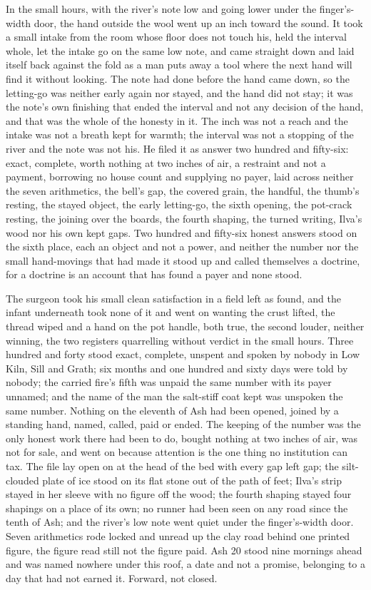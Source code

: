 In the small hours, with the river's note low and going lower under the finger's-width door, the hand outside the wool went up an inch toward the sound. It took a small intake from the room whose floor does not touch his, held the interval whole, let the intake go on the same low note, and came straight down and laid itself back against the fold as a man puts away a tool where the next hand will find it without looking. The note had done before the hand came down, so the letting-go was neither early again nor stayed, and the hand did not stay; it was the note's own finishing that ended the interval and not any decision of the hand, and that was the whole of the honesty in it. The inch was not a reach and the intake was not a breath kept for warmth; the interval was not a stopping of the river and the note was not his. He filed it as answer two hundred and fifty-six: exact, complete, worth nothing at two inches of air, a restraint and not a payment, borrowing no house count and supplying no payer, laid across neither the seven arithmetics, the bell's gap, the covered grain, the handful, the thumb's resting, the stayed object, the early letting-go, the sixth opening, the pot-crack resting, the joining over the boards, the fourth shaping, the turned writing, Ilva's wood nor his own kept gaps. Two hundred and fifty-six honest answers stood on the sixth place, each an object and not a power, and neither the number nor the small hand-movings that had made it stood up and called themselves a doctrine, for a doctrine is an account that has found a payer and none stood.

The surgeon took his small clean satisfaction in a field left as found, and the infant underneath took none of it and went on wanting the crust lifted, the thread wiped and a hand on the pot handle, both true, the second louder, neither winning, the two registers quarrelling without verdict in the small hours. Three hundred and forty stood exact, complete, unspent and spoken by nobody in Low Kiln, Sill and Grath; six months and one hundred and sixty days were told by nobody; the carried fire's fifth was unpaid the same number with its payer unnamed; and the name of the man the salt-stiff coat kept was unspoken the same number. Nothing on the eleventh of Ash had been opened, joined by a standing hand, named, called, paid or ended. The keeping of the number was the only honest work there had been to do, bought nothing at two inches of air, was not for sale, and went on because attention is the one thing no institution can tax. The file lay open on  at the head of the bed with every gap left gap; the silt-clouded plate of ice stood on its flat stone out of the path of feet; Ilva's strip stayed in her sleeve with no figure off the wood; the fourth shaping stayed four shapings on a place of its own; no runner had been seen on any road since the tenth of Ash; and the river's low note went quiet under the finger's-width door. Seven arithmetics rode locked and unread up the clay road behind one printed figure, the figure read still not the figure paid. Ash 20 stood nine mornings ahead and was named nowhere under this roof, a date and not a promise, belonging to a day that had not earned it. Forward, not closed.
